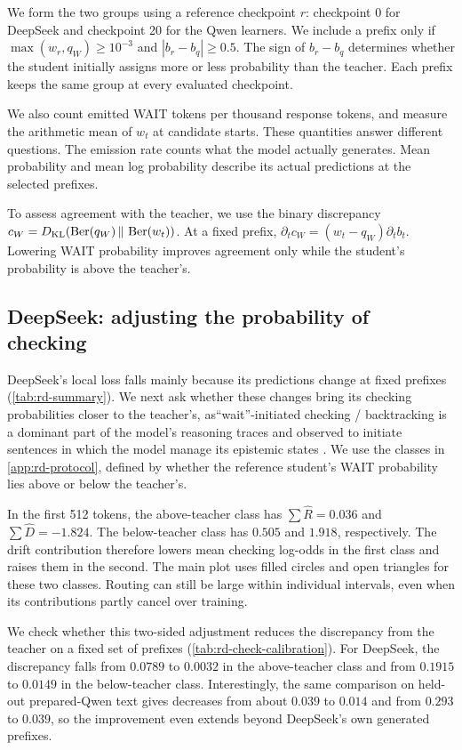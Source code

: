 We form the two groups using a reference checkpoint $r$: checkpoint 0 for DeepSeek and checkpoint 20 for the Qwen learners. We include a prefix only if $\max(w_r,q_W)\ge10^{-3}$ and $|b_r-b_q|\ge0.5$. The sign of $b_r-b_q$ determines whether the student initially assigns more or less probability than the teacher. Each prefix keeps the same group at every evaluated checkpoint.

We also count emitted WAIT tokens per thousand response tokens, and measure the arithmetic mean of $w_t$ at candidate starts. These quantities answer different questions. The emission rate counts what the model actually generates. Mean probability and mean log probability describe its actual predictions at the selected prefixes. 

To assess agreement with the teacher, we use the binary discrepancy $c_W=D_{\mathrm{KL}}\!\left(\operatorname{Ber}(q_W) \,\Vert\, \operatorname{Ber}(w_t)\right)$. At a fixed prefix, $\partial_t c_W=(w_t-q_W)\partial_t b_t$. Lowering WAIT probability improves agreement only while the student's probability is above the teacher's. 



\subsection{DeepSeek: adjusting the probability of checking}
\label{app:rd-checking}

DeepSeek's local loss falls mainly because its predictions change at fixed prefixes (\cref{tab:rd-summary}). We next ask whether these changes bring its checking probabilities closer to the teacher's, as``wait''-initiated checking / backtracking is a dominant part of the model's reasoning traces and observed to initiate sentences in which the model manage its epistemic states \citep{marjanovic2026deepseekr}. We use the classes in \cref{app:rd-protocol}, defined by whether the reference student's WAIT probability lies above or below the teacher's.

In the first 512 tokens, the above-teacher class has $\sum\widehat R=0.036$ and $\sum\widehat D=-1.824$. The below-teacher class has $0.505$ and $1.918$, respectively. The drift contribution therefore lowers mean checking log-odds in the first class and raises them in the second. The main plot uses filled circles and open triangles for these two classes. Routing can still be large within individual intervals, even when its contributions partly cancel over training.

We check whether this two-sided adjustment reduces the discrepancy from the teacher on a fixed set of prefixes (\cref{tab:rd-check-calibration}). For DeepSeek, the discrepancy falls from $0.0789$ to $0.0032$ in the above-teacher class and from $0.1915$ to $0.0149$ in the below-teacher class. Interestingly, the same comparison on held-out prepared-Qwen text gives decreases from about $0.039$ to $0.014$ and from $0.293$ to $0.039$, so the improvement even extends beyond DeepSeek's own generated prefixes.

